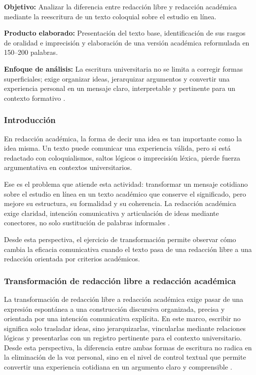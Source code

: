 \begin{portafolioabstract}
	\textbf{Objetivo:} Analizar la diferencia entre redacción libre y redacción académica mediante la reescritura de un texto coloquial sobre el estudio en línea.

	\textbf{Producto elaborado:} Presentación del texto base, identificación de sus rasgos de oralidad e imprecisión y elaboración de una versión académica reformulada en 150--200 palabras.

	\textbf{Enfoque de análisis:} La escritura universitaria no se limita a corregir formas superficiales; exige organizar ideas, jerarquizar argumentos y convertir una experiencia personal en un mensaje claro, interpretable y pertinente para un contexto formativo \citep{nunezcortesEscrituraAcademicaTeoria2015,correaManualBasicoEscritura2018}.
\end{portafolioabstract}

\subsubsection{Introducción}

En redacción académica, la forma de decir una idea es tan importante como la idea misma. Un texto puede comunicar una experiencia válida, pero si está redactado con coloquialismos, saltos lógicos o imprecisión léxica, pierde fuerza argumentativa en contextos universitarios.

Ese es el problema que atiende esta actividad: transformar un mensaje cotidiano sobre el estudio en línea en un texto académico que conserve el significado, pero mejore su estructura, su formalidad y su coherencia. La redacción académica exige claridad, intención comunicativa y articulación de ideas mediante conectores, no solo sustitución de palabras informales \citep{correaManualBasicoEscritura2018,vitoriaEscrituraAcademicaFormacion2019}.

Desde esta perspectiva, el ejercicio de transformación permite observar cómo cambia la eficacia comunicativa cuando el texto pasa de una redacción libre a una redacción orientada por criterios académicos.

\subsubsection{Transformación de redacción libre a redacción académica}

La transformación de redacción libre a redacción académica exige pasar de una expresión espontánea a una construcción discursiva organizada, precisa y orientada por una intención comunicativa explícita. En este marco, escribir no significa solo trasladar ideas, sino jerarquizarlas, vincularlas mediante relaciones lógicas y presentarlas con un registro pertinente para el contexto universitario. Desde esta perspectiva, la diferencia entre ambas formas de escritura no radica en la eliminación de la voz personal, sino en el nivel de control textual que permite convertir una experiencia cotidiana en un argumento claro y comprensible \citep{nunezcortesEscrituraAcademicaTeoria2015,correaManualBasicoEscritura2018,vitoriaEscrituraAcademicaFormacion2019}.

